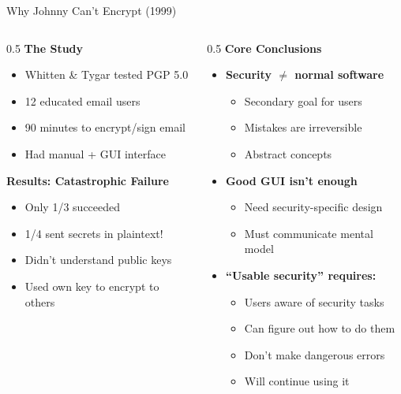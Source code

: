 \documentclass[aspectratio=169, lualatex, handout]{beamer}
\begin{document}
\begin{frame}{Why Johnny Can't Encrypt (1999)}
	\begin{columns}[T]
		\begin{column}{0.5\textwidth}
			\textbf{The Study}
			\begin{itemize}
				\item Whitten \& Tygar tested PGP 5.0
				\item 12 educated email users
				\item 90 minutes to encrypt/sign email
				\item Had manual + GUI interface
			\end{itemize}
			\vspace{0.5em}
			\textbf{Results: Catastrophic Failure}
			\begin{itemize}
				\item Only 1/3 succeeded
				\item 1/4 sent secrets in plaintext!
				\item Didn't understand public keys
				\item Used own key to encrypt to others
			\end{itemize}
		\end{column}
		\begin{column}{0.5\textwidth}
			\textbf{Core Conclusions}
			\begin{itemize}
				\item \textbf{Security $\neq$ normal software}
				      \begin{itemize}
					      \item Secondary goal for users
					      \item Mistakes are irreversible
					      \item Abstract concepts
				      \end{itemize}
				\item \textbf{Good GUI isn't enough}
				      \begin{itemize}
					      \item Need security-specific design
					      \item Must communicate mental model
				      \end{itemize}
				\item \textbf{``Usable security'' requires:}
				      \begin{itemize}
					      \item Users aware of security tasks
					      \item Can figure out how to do them
					      \item Don't make dangerous errors
					      \item Will continue using it
				      \end{itemize}
			\end{itemize}
		\end{column}
	\end{columns}
\end{frame}
\end{document}
